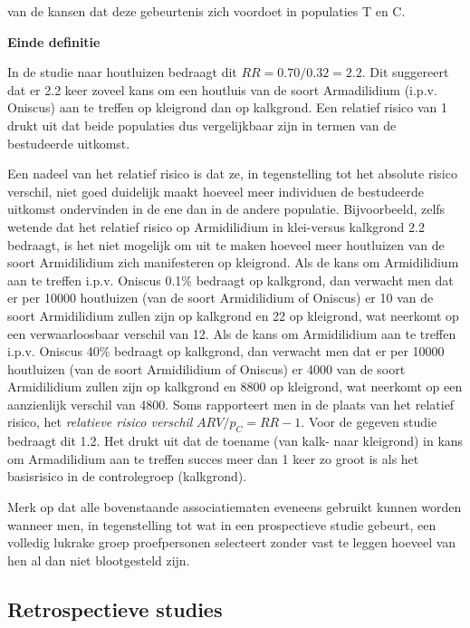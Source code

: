\documentclass[
  12pt,dutch,coursenotes]{book}
\theoremstyle{definition}
\theoremstyle{definition}
\theoremstyle{definition}
\theoremstyle{remark}
\begin{document}
van de kansen dat deze gebeurtenis zich voordoet in populaties T en C.

\textbf{Einde definitie}

In de studie naar houtluizen bedraagt dit \(RR=0.70/0.32=2.2\). Dit
suggereert dat er 2.2 keer zoveel kans om een houtluis van de soort Armadilidium (i.p.v. Oniscus) aan te treffen op kleigrond dan op kalkgrond. Een
relatief risico van 1 drukt uit dat beide populaties dus vergelijkbaar zijn in termen van de bestudeerde uitkomst.

Een nadeel van het relatief risico is dat ze, in tegenstelling tot het absolute risico verschil, niet goed duidelijk maakt hoeveel meer individuen de bestudeerde uitkomst ondervinden in de ene dan in de andere populatie. Bijvoorbeeld, zelfs wetende dat het relatief risico op Armidilidium in klei-versus kalkgrond 2.2 bedraagt, is het niet mogelijk om uit te maken hoeveel meer houtluizen van de soort Armidilidium zich manifesteren op kleigrond. Als de kans om Armidilidium aan te treffen i.p.v. Oniscus 0.1\% bedraagt op kalkgrond, dan verwacht men dat er per 10000 houtluizen (van de soort Armidilidium of Oniscus) er 10 van de soort Armidilidium zullen zijn op kalkgrond en 22 op kleigrond, wat neerkomt op een verwaarloosbaar verschil van 12. Als de kans om Armidilidium aan te treffen i.p.v. Oniscus 40\% bedraagt op kalkgrond, dan verwacht men dat er per 10000 houtluizen (van de soort Armidilidium of Oniscus) er 4000 van de soort Armidilidium zullen zijn op kalkgrond en 8800 op kleigrond, wat neerkomt op een aanzienlijk verschil van 4800. Soms rapporteert men in de plaats van het relatief risico, het
\emph{relatieve risico verschil} \(ARV/p_C=RR-1\). Voor de gegeven studie
bedraagt dit 1.2. Het drukt uit dat de toename (van kalk- naar kleigrond) in kans om Armadilidium aan te treffen succes meer dan 1 keer zo groot is als het basisrisico in de controlegroep (kalkgrond).

Merk op dat alle bovenstaande associatiematen eveneens gebruikt kunnen
worden wanneer men, in tegenstelling tot wat in een prospectieve studie
gebeurt, een volledig lukrake groep proefpersonen selecteert zonder vast te
leggen hoeveel van hen al dan niet blootgesteld zijn.

\hypertarget{subsec:retrospect}{%
\subsection{Retrospectieve studies}\label{subsec:retrospect}}
\end{document}
